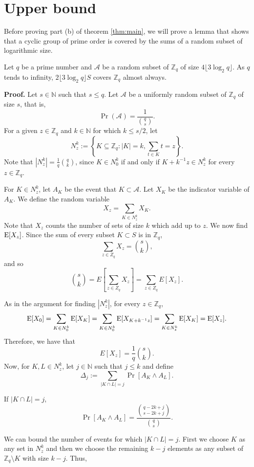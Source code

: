 \section{Upper bound}\label{sec:results:upperbound}
Before proving part (b) of theorem \ref{thm:main}, we will prove a lemma that shows that a cyclic group of prime order is covered by the sums of a random subset of logarithmic size.  
\begin{lemma}\label{lem:sumset}
    Let $q$ be a prime number and $\mathcal{A}$ be a random subset of $\mathbb{Z}_q$ of size $4\lfloor3\log_2 q\rfloor$. As $q$ tends to infinity, $2\lfloor3\log_2 q\rfloor S$ covers $\mathbb{Z}_q$ almost always. 
\end{lemma}

\textbf{Proof. } Let $s \in \mathbb{N}$ such that $s\leq q$. Let $\mathcal{A}$ be a uniformly random subset of $\mathbb{Z}_q$ of size $s$, that is, 
\[\Pr(\mathcal{A}) = \frac{1}{\binom{q}{s}}.\]
For a given $z \in \mathbb{Z}_q$ and $k \in \mathbb{N}$ for which $k \leq s/2$, let 
\[N_z^k := \left\{K \subseteq \mathbb{Z}_q: |K| = k, \sum_{t \in K} t = z\right\}.\]
Note that $|N_z^k| = \frac{1}{q}{\binom{q}{k}}$, since $K \in N_0^k$ if and only if $K + k^{-1}z \in N_z^k$ for every $z \in \mathbb{Z}_q$.\par
For $K \in N_z^k$, let $A_K$ be the event that $K \subset\mathcal{A}$. Let $X_K$ be the indicator variable of $A_K$.
We define the random variable 
\[X_z = \sum_{K \in N_z^k} X_K.\]
Note that $X_z$ counts the number of sets of size $k$ which add up to $z$. We now find $\mathrm{E}[X_z]$. Since the sum of every subset $K \subset S$ is in $\mathbb{Z}_q$,
\[\sum_{z \in Z_q} X_z = {\binom{s}{k}},\]
and so
\[\binom{s}{k} = E\left[\sum_{z \in Z_q} X_z\right] =  \sum_{z \in Z_q} E[X_z].\]\par
As in the argument for finding $|N_z^k|$, for every $z \in \mathbb{Z}_q$, 
\[\mathrm{E}[X_0] = \sum_{K \in N_0^k}\mathrm{E}[X_K] = \sum_{K \in N_0^k} \mathrm{E}[X_{K + k^{-1}z}] = \sum_{K \in N_z^k} \mathrm{E}[X_K] = \mathrm{E}[X_z].\]
Therefore, we have that
\begin{equation}\label{eq:upperbound:expected}
E[X_z] = \frac{1}{q} {\binom{s}{k}}.
\end{equation}
Now, for $K, L \in N_z^k$, let $j \in \mathbb{N}$ such that $j \leq k$ and define
\[\Delta_j := \sum_{|K \cap L| = j} \Pr[A_K \land A_L].\]
\par 
If $|K \cap L| = j$,
\[\Pr[A_K \land A_L] = \frac{\binom{q - 2k + j}{s - 2k + j}}{\binom{q}{s}}.\]
\par
We can bound the number of events for which $|K \cap L| = j$. First we choose $K$ as any set in $N_z^k$ and then we choose the remaining $k- j$ elements as any subset of $\mathbb{Z}_q \setminus K$ with size $k - j$. Thus, 
